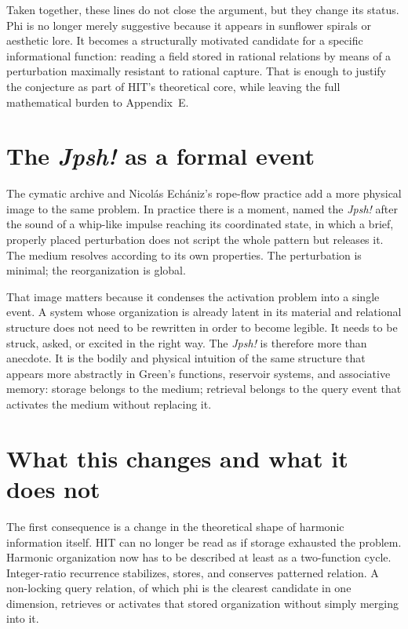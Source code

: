 Taken together, these lines do not close the argument, but they change its status. Phi is no longer merely suggestive because it appears in sunflower spirals or aesthetic lore. It becomes a structurally motivated candidate for a specific informational function: reading a field stored in rational relations by means of a perturbation maximally resistant to rational capture. That is enough to justify the conjecture as part of HIT's theoretical core, while leaving the full mathematical burden to Appendix~E.

\section{The \emph{Jpsh!} as a formal event}

The cymatic archive and Nicol\'as Ech\'aniz's rope-flow practice add a more physical image to the same problem. In practice there is a moment, named the \emph{Jpsh!} after the sound of a whip-like impulse reaching its coordinated state, in which a brief, properly placed perturbation does not script the whole pattern but releases it. The medium resolves according to its own properties. The perturbation is minimal; the reorganization is global.

That image matters because it condenses the activation problem into a single event. A system whose organization is already latent in its material and relational structure does not need to be rewritten in order to become legible. It needs to be struck, asked, or excited in the right way. The \emph{Jpsh!} is therefore more than anecdote. It is the bodily and physical intuition of the same structure that appears more abstractly in Green's functions, reservoir systems, and associative memory: storage belongs to the medium; retrieval belongs to the query event that activates the medium without replacing it.

\section{What this changes and what it does not}

The first consequence is a change in the theoretical shape of harmonic information itself. HIT can no longer be read as if storage exhausted the problem. Harmonic organization now has to be described at least as a two-function cycle. Integer-ratio recurrence stabilizes, stores, and conserves patterned relation. A non-locking query relation, of which phi is the clearest candidate in one dimension, retrieves or activates that stored organization without simply merging into it.


